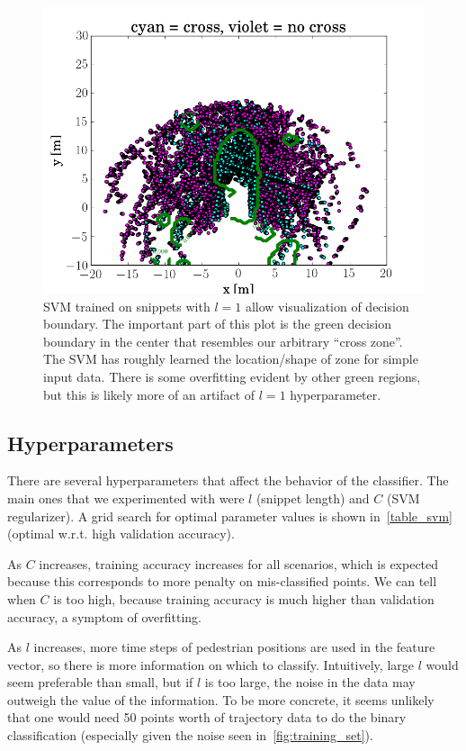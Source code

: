 \begin{figure}
	\centering
	\includegraphics [trim=0 0 0 0, clip, angle=0, width=0.8\columnwidth,
	keepaspectratio]{figures/svm_snippet1}
	\caption{SVM trained on snippets with $l=1$ allow visualization of decision boundary. The important part of this plot is the green decision boundary in the center that resembles our arbitrary ``cross zone''. The SVM has roughly learned the location/shape of zone for simple input data. There is some overfitting evident by other green regions, but this is likely more of an artifact of $l=1$ hyperparameter.} 
	\label{fig:svm_snippet1} 
\end{figure}

\subsection{Hyperparameters}
There are several hyperparameters that affect the behavior of the classifier.
The main ones that we experimented with were $l$ (snippet length) and $C$ (SVM regularizer).
A grid search for optimal parameter values is shown in~\cref{table_svm} (optimal w.r.t. high validation accuracy).

As $C$ increases, training accuracy increases for all scenarios, which is expected because this corresponds to more penalty on mis-classified points.
We can tell when $C$ is too high, because training accuracy is much higher than validation accuracy, a symptom of overfitting.

As $l$ increases, more time steps of pedestrian positions are used in the feature vector, so there is more information on which to classify.
Intuitively, large $l$ would seem preferable than small, but if $l$ is too large, the noise in the data may outweigh the value of the information.
To be more concrete, it seems unlikely that one would need 50 points worth of trajectory data to do the binary classification (especially given the noise seen in~\cref{fig:training_set}).

